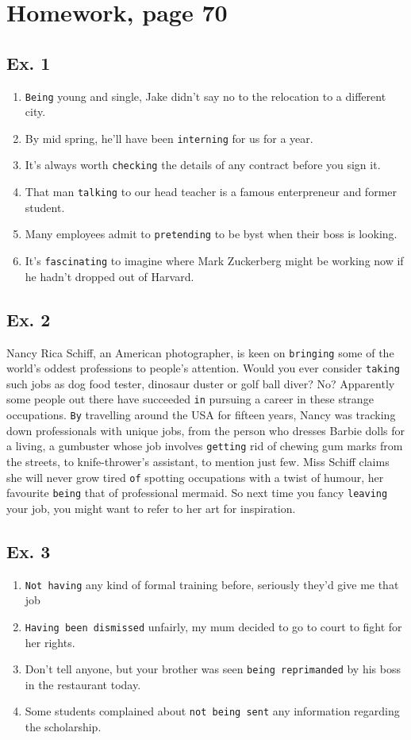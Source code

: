 \documentclass[a4paper]{article}
\begin{document}
\section{Homework, page 70}
\subsection{Ex. 1}
\begin{enumerate}
  \item {\tt Being} young and single, Jake didn't say no to the relocation to a different city.
  \item By mid spring, he'll have been {\tt interning} for us for a year.
  \item It's always worth {\tt checking} the details of any contract before you sign it.
  \item That man {\tt talking} to our head teacher is a famous enterpreneur and former student.
  \item Many employees admit to {\tt pretending} to be byst when their boss is looking.
  \item It's {\tt fascinating} to imagine where Mark Zuckerberg might be working now if he hadn't dropped out of Harvard.
\end{enumerate}

\subsection{Ex. 2}
Nancy Rica Schiff, an American photographer, is keen on {\tt bringing} some of the world's oddest professions to people's attention. Would you ever consider {\tt taking} such jobs as dog food tester, dinosaur duster or golf ball diver? No? Apparently some people out there have succeeded {\tt in} pursuing a career in these strange occupations. {\tt By} travelling around the USA for fifteen years, Nancy was tracking down professionals with unique jobs, from the person who dresses Barbie dolls for a living, a gumbuster whose job involves {\tt getting} rid of chewing gum marks from the streets, to knife-thrower's assistant, to mention just few. Miss Schiff claims she will never grow tired {\tt of} spotting occupations with a twist of humour, her favourite {\tt being} that of professional mermaid. So next time you fancy {\tt leaving} your job, you might want to refer to her art for inspiration.

\subsection{Ex. 3}
\begin{enumerate}
  \item {\tt Not having} any kind of formal training before, seriously they'd give me that job
  \item {\tt Having been dismissed} unfairly, my mum decided to go to court to fight for her rights.
  \item Don't tell anyone, but your brother was seen {\tt being reprimanded} by his boss in the restaurant today.
  \item Some students complained about {\tt not being sent} any information regarding the scholarship.
\end{enumerate}
\end{document}
